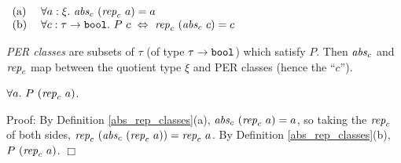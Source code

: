 \documentclass[envcountsame,runningheads]{llncs}
\begin{document}
\begin{definition}
\label{abs_rep_classes}
$
\begin{array}[t]{ll}
(\mbox{\rm a})\ & \forall a:\xi.\ {\it abs}_c \ ({\it rep}_c \ a) = a
\\
(\mbox{\rm b}) & \forall c:\tau \rightarrow \mbox{\tt bool}.\ 
P\ c
\ \Leftrightarrow \ {\it rep}_c \ ({\it abs}_c \ c) = c
\end{array}
$
\end{definition}

\noindent
{\it PER classes\/}
are subsets of $\tau$ (of type $\tau \rightarrow \mbox{\tt bool}$)
which satisfy $P$.
Then ${\it abs}_c$ and ${\it rep}_c$
map between
the quotient type $\xi$
and
PER classes (hence the ``$c$'').

%

\begin{lemma}
\label{ty_REP_REL}
$\forall a.\ 
P\ ({\it rep}_c\ a)$.
\end{lemma}
Proof:
By
Definition \ref{abs_rep_classes}(a),
$ {\it abs}_c\ ({\it rep}_c\ a) = a$, so taking
the ${\it rep}_c$ of both sides,
$ {\it rep}_c\ ({\it abs}_c\ ({\it rep}_c\ a)) = {\it rep}_c\ a$.
By
Definition \ref{abs_rep_classes}(b),
$P\ ({\it rep}_c\ a)$.
$\Box$
\end{document}
